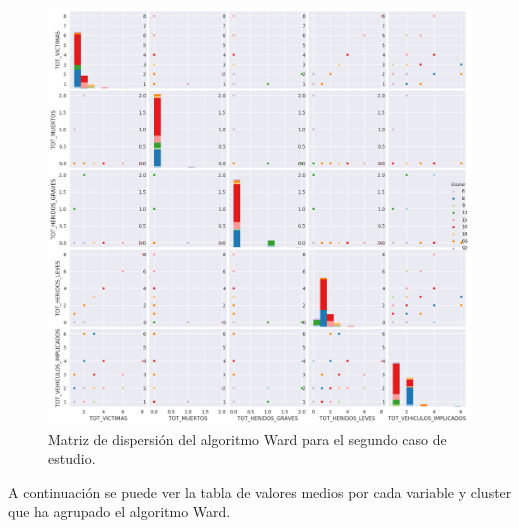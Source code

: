 	\begin{figure}[H]
		\centering
		\includegraphics[scale=0.5]{plots/Ward-EarlyMorningAccidents-ScatterMatrix.png}
		\caption{Matriz de dispersión del algoritmo Ward para el segundo caso de estudio.}
	\end{figure}
	
	A continuación se puede ver la tabla de valores medios por cada variable y cluster que ha agrupado el algoritmo Ward.
	
